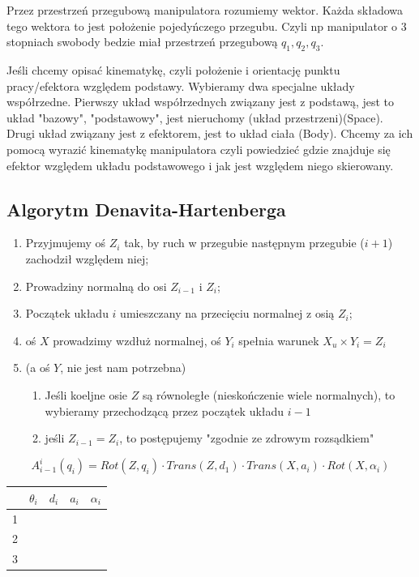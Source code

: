 \documentclass{article}
\begin{document}
Przez przestrzeń przegubową manipulatora rozumiemy wektor. Każda składowa tego wektora to jest położenie pojedyńczego przegubu. Czyli np manipulator o 3 stopniach swobody bedzie miał przestrzeń przegubową $q_{1}, q_{2}, q_{3}$.

Jeśli chcemy opisać kinematykę, czyli położenie i orientację punktu pracy/efektora względem podstawy. Wybieramy dwa specjalne układy współrzedne.
Pierwszy układ współrzednych związany jest z podstawą, jest to układ "bazowy", "podstawowy", jest nieruchomy (układ przestrzeni)(Space).
Drugi układ związany jest z efektorem, jest to układ ciała (Body).
Chcemy za ich pomocą wyrazić kinematykę manipulatora czyli powiedzieć gdzie znajduje się efektor względem układu podstawowego i jak jest względem niego skierowany.

\newpage

\subsection{Algorytm Denavita-Hartenberga}

\begin{enumerate}
\item Przyjmujemy oś $Z_i$ tak, by ruch w przegubie następnym przegubie ($i+1$) zachodził względem niej;
\item Prowadziny normalną do osi $Z_{i-1}$ i $Z_i$;
\item Początek układu $i$ umieszczany na przecięciu normalnej z osią $Z_i$;
\item oś $X$ prowadzimy wzdłuż normalnej, oś $Y_i$ spełnia warunek $X_u \times Y_i = Z_i$
\item (a oś $Y$, nie jest nam potrzebna)
\begin{enumerate}
    \item Jeśli koeljne osie $Z$ są równoległe (nieskończenie wiele normalnych),
    to wybieramy przechodzącą przez początek układu $i-1$
    \item jeśli $Z_{i-1} = Z_i$, to postępujemy "zgodnie ze zdrowym rozsądkiem"
\end{enumerate}
\end{enumerate}

\Large
$$
    A_{i-1}^i (q_i) = Rot(Z,q_i) \cdot Trans(Z,d_1) \cdot Trans( X, a_i ) \cdot Rot( X, \alpha_i )
$$
\normalsize

\begin{table}[h!]
    \centering
    \Large
    \begin{tabular}{c|c|c|c|c}
            & $\theta_i$& $d_i$     & $a_i$     & $\alpha_i$\\ \hline
        1   &           &           &           &           \\ \hline
        2   &           &           &           &           \\ \hline
        3   &           &           &           &           \\
    \end{tabular}
\end{table}
\end{document}
